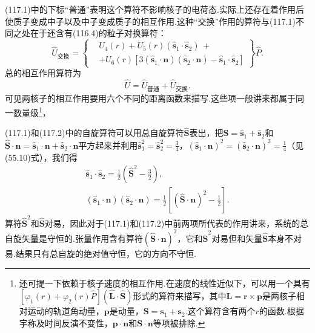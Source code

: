 (117.1)中的下标“普通”表明这个算符不影响核子的电荷态.实际上还存在着作用后使质子变成中子以及中子变成质子的相互作用.这种“交换”作用的算符与(117.1)不同之处在于还含有(116.4)的粒子对换算符：
\begin{equation}
  \hat{U}_{\text{交换}}=\left\{
  \begin{aligned}
    &U_4(r)+U_5(r)\left(\hat{\boldsymbol{s}}_1\cdot\hat{\boldsymbol{s}}_2\right)\,+\\
    &+U_6(r)\left[3(\hat{\boldsymbol{s}}_1\cdot\boldsymbol{n})(\hat{\boldsymbol{s}}_2\cdot\boldsymbol{n})-\hat{\boldsymbol{s}}_1\cdot\hat{\boldsymbol{s}}_2\right]
  \end{aligned}\right\}\hat{P}.
\end{equation}
总的相互作用算符为
\begin{equation}
  \hat{U}=\hat{U}_{\text{普通}}+\hat{U}_{\text{交换}}.
\end{equation}
可见两核子的相互作用要用六个不同的距离函数来描写.这些项一般讲来都属于同一数量级\footnote{还可提一下依赖于核子速度的相互作用.在速度的线性近似下，可以用一个具有$[\varphi_1(r)+\varphi_2(r)\hat{P}](\hat{\boldsymbol{L}}\cdot\hat{\boldsymbol{S}})$形式的算符来描写，其中$\boldsymbol{L}=\boldsymbol{r}\times\boldsymbol{p}$是两核子相对运动的轨道角动量，$\boldsymbol{p}$是动量，$\boldsymbol{S}=\boldsymbol{s}_1+\boldsymbol{s}_2$.这个算符含有两个$r$的函数.根据宇称及时间反演不变性，$\boldsymbol{p}\cdot\boldsymbol{n}$和$\boldsymbol{S}\cdot\boldsymbol{n}$等项被排除.}，

(117.1)和(117.2)中的自旋算符可以用总自旋算符$\hat{\boldsymbol{S}}$表出，把$\hat{\boldsymbol{S}}=\hat{\boldsymbol{s}}_1+\hat{\boldsymbol{s}}_2$和$\hat{\boldsymbol{S}}\cdot\boldsymbol{n}=\hat{\boldsymbol{s}}_1\cdot\boldsymbol{n}+\hat{\boldsymbol{s}}_2\cdot\boldsymbol{n}$平方起来并利用$\hat{\boldsymbol{s}}_1^2=\hat{\boldsymbol{s}}_2^2=\frac{3}{4}$，$(\hat{\boldsymbol{s}}_1\cdot\boldsymbol{n})^2=(\hat{\boldsymbol{s}}_2\cdot\boldsymbol{n})^2=\frac{1}{4}$（见(55.10)式），我们得
\begin{equation}
\begin{gathered}
  \hat{\boldsymbol{s}}_1\cdot\hat{\boldsymbol{s}}_2
  =\frac{1}{2}\left(\hat{\boldsymbol{S}}^2-\frac{3}{2}\right),\\
  \left(\hat{\boldsymbol{s}}_1\cdot\boldsymbol{n}\right)
  \left(\hat{\boldsymbol{s}}_2\cdot\boldsymbol{n}\right)
  =\frac{1}{2}\left[\left(\hat{\boldsymbol{S}}\cdot\boldsymbol{n}\right)^2-\frac{1}{2}\right].
\end{gathered}
\end{equation}
算符$\hat{\boldsymbol{S}}^2$和$\hat{\boldsymbol{S}}$对易，因此对于(117.1)和(117.2)中前两项所代表的作用讲来，系统的总自旋矢量是守恒的.张量作用含有算符$(\hat{\boldsymbol{S}}\cdot\boldsymbol{n})^2$，它和$\hat{\boldsymbol{S}}^2$对易但和矢量$\hat{\boldsymbol{S}}$本身不对易.结果只有总自旋的绝对值守恒，它的方向不守恒.

